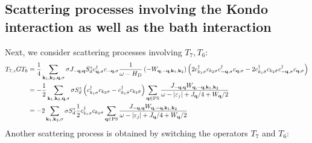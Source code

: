\documentclass{revtex4-2}
\begin{document}
\subsection{Scattering processes involving the Kondo interaction as well as the bath interaction}
Next, we consider scattering processes involving \(T_7, T_6\):
\begin{equation}\begin{aligned}\label{t7t6}
	T_{7,z} G T_6 &= \frac{1}{4}\sum_{{\bf k}_1,{\bf k}_2,{\bf q},\sigma}\sigma J_{-{\bf q},{\bf q}}S_d^z c^\dagger_{{\bf q},\sigma} c_{-{\bf q},\sigma} \frac{1}{\omega - H_D} \left(- W_{{\bf q},-{\bf q},{\bf k}_1, {\bf k}_2}\right) \left(2 c^\dagger_{k_1\sigma}c_{k_2\sigma}c^\dagger_{-{\bf q},\sigma}c_{{\bf q},\sigma} - 2 c^\dagger_{k_1\bar\sigma}c_{k_2\bar\sigma}c^\dagger_{-{\bf q},\sigma}c_{{\bf q},\sigma}\right)\\
			      &= -\frac{1}{2}\sum_{{\bf k}_1,{\bf k}_2,{\bf q},\sigma}\sigma S_d^z \left(c^\dagger_{k_1\sigma}c_{k_2\sigma} - c^\dagger_{k_1\bar\sigma}c_{k_2\bar\sigma}\right) \sum_{{\bf q} \in \text{PS}}\frac{J_{-{\bf q},{\bf q}} W_{{\bf q},-{\bf q},{\bf k}_1, {\bf k}_2}}{\omega - |\varepsilon_j| + J_{{\bf q}}/4 + W_{{\bf q}}/2} \\
			      &= -2\sum_{{\bf k}_1,{\bf k}_2,\sigma}\sigma S_d^z \frac{1}{2}c^\dagger_{k_1\sigma}c_{k_2\sigma} \sum_{{\bf q} \in \text{PS}}\frac{J_{-{\bf q},{\bf q}} W_{{\bf q},-{\bf q},{\bf k}_1, {\bf k}_2}}{\omega - |\varepsilon_j| + J_{{\bf q}}/4 + W_{{\bf q}}/2} 
\end{aligned}\end{equation}
Another scattering process is obtained by switching the operators \(T_7\) and \(T_6\):
\end{document}
